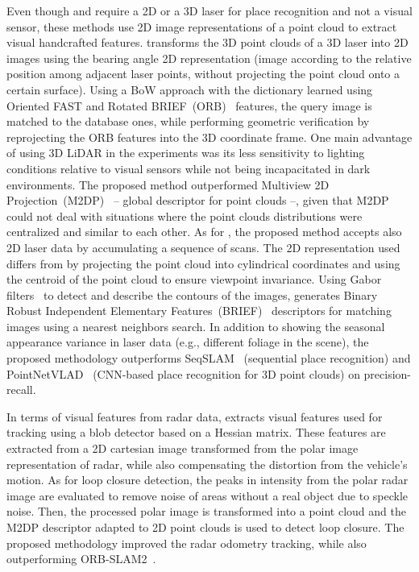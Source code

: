 Even though \cite{cao-et-al:2018:2815956} and \cite{cao-et-al:2021:2962416} require a 2D or a 3D laser for place recognition and not a visual sensor, these methods use 2D image representations of a point cloud to extract visual handcrafted features.
\cite{cao-et-al:2018:2815956} transforms the 3D point clouds of a 3D laser into 2D images using the bearing angle 2D representation (image according to the relative position among adjacent laser points, without projecting the point cloud onto a certain surface). Using a BoW approach with the dictionary learned using Oriented FAST and Rotated BRIEF~(ORB)~\parencite{original:orb} features, the query image is matched to the database ones, while performing geometric verification by reprojecting the ORB features into the 3D coordinate frame. One main advantage of using 3D LiDAR in the experiments was its less sensitivity to lighting conditions relative to visual sensors while not being incapacitated in dark environments. The proposed method outperformed Multiview 2D Projection~(M2DP)~\parencite{discussion:m2dp} -- global descriptor for point clouds --, given that M2DP could not deal with situations where the point clouds distributions were centralized and similar to each other.
As for \cite{cao-et-al:2021:2962416}, the proposed method accepts also 2D laser data by accumulating a sequence of scans. The 2D representation used differs from \cite{cao-et-al:2018:2815956} by projecting the point cloud into cylindrical coordinates and using the centroid of the point cloud to ensure viewpoint invariance.
Using Gabor filters~\parencite{original:gabor-filter} to detect and describe the contours of the images, \cite{cao-et-al:2021:2962416} generates Binary Robust Independent Elementary Features~(BRIEF)~\parencite{original:brief} descriptors for matching images using a nearest neighbors search. In addition to showing the seasonal appearance variance in laser data (e.g., different foliage in the scene), the proposed methodology outperforms SeqSLAM~\parencite{discussion:seqslam} (sequential place recognition) and PointNetVLAD~\parencite{discussion:pointnetvlad} (CNN-based place recognition for 3D point clouds) on precision-recall.

In terms of visual features from radar data, \cite{hong-et-al:2022:02783649221080483} extracts visual features used for tracking using a blob detector based on a Hessian matrix. These features are extracted from a 2D cartesian image transformed from the polar image representation of radar, while also compensating the distortion from the vehicle's motion.
As for loop closure detection, the peaks in intensity from the polar radar image are evaluated to remove noise of areas without a real object due to speckle noise. Then, the processed polar image is transformed into a point cloud and the M2DP descriptor adapted to 2D point clouds is used to detect loop closure.
The proposed methodology improved the radar odometry tracking, while also outperforming ORB-SLAM2~\parencite{discussion:orb-slam2}.



